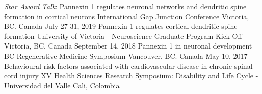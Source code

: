 \begin{cventries}
  \cventry
    {\textit{Star Award Talk}: Pannexin 1 regulates neuronal networks and dendritic spine formation in cortical neurons} %
    {International Gap Junction Conference} %
    {Victoria, BC. Canada} %
    {July 27-31, 2019} %
    {
    }
    \cventry
    {Pannexin 1 regulates cortical dendritic spine formation} %
    {University of Victoria - Neuroscience Graduate Program Kick-Off} %
    {Victoria, BC. Canada} %
    {September 14, 2018} %
   {
   }
   \cventry
   {Pannexin 1 in neuronal development} %
   {BC Regenerative Medicine Symposium} %
   {Vancouver, BC. Canada} %
   {May 10, 2017} %
   {
   }
  \cventry
    {Behavioural risk factors associated with cardiovascular disease in chronic spinal cord injury} %
    {XV Health Sciences Research Symposium: Disability and Life Cycle - Universidad del Valle} %
    {Cali, Colombia} %

\end{cventries}
